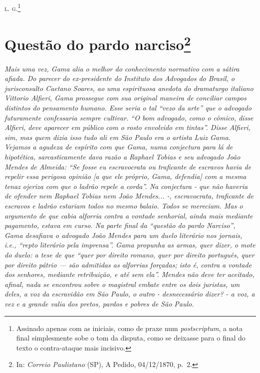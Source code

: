 {\textsc{l. g.}\footnote{ Assinado apenas com as iniciais, como de praxe num
  \emph{postscriptum}, a nota final simplesmente sobe o tom da disputa,
  como se deixasse para o final do texto o contra-ataque mais incisivo.}

\chapter{Questão do pardo narciso\footnote{ In: \emph{Correio Paulistano} (SP), A Pedido, 04/12/1870,
  p.~2.}} %

\begin{didascalia}
\emph{Mais uma vez, Gama alia o melhor do conhecimento normativo com a
sátira afiada. Do parecer do ex-presidente do Instituto dos Advogados do
Brasil, o jurisconsulto Caetano Soares, ao uma espirituosa anedota do
dramaturgo italiano Vittorio Alfieri, Gama prossegue com sua original
maneira de conciliar campos distintos do pensamento humano. Esse seria o
tal ``vezo da arte'' que o advogado futuramente confessaria sempre
cultivar. ``O bom advogado, como o cômico, disse Alfieri, deve aparecer
em público com o rosto envolvido em tintas''. Disse Alfieri, sim, mas
quem dizia isso tudo ali em São Paulo era o artista Luiz Gama. Vejamos a
agudeza de espírito com que Gama, numa conjectura para lá de hipotética,
sarcasticamente dava razão a Raphael Tobias e seu advogado João Mendes
de Almeida: ``Se fosse eu escravocrata ou traficante de escravos havia de
repelir essa perigosa opinião {[}a que ele próprio, Gama, defendia{]}
com a mesma tenaz ojeriza com que o ladrão repele a corda''. Na
conjectura - que não haveria de ofender nem Raphael Tobias nem João
Mendes... -, escravocrata, traficante de escravos e ladrão estariam
todos no mesmo balaio. Todos se mereciam. Mas o argumento de que cabia
alforria contra a vontade senhorial, ainda mais mediante pagamento,
estava em curso. Na parte final da ``questão do pardo Narciso'', Gama
desafiava o advogado João Mendes para um duelo literário nos jornais,
i.e., ``repto literário pela imprensa''. Gama propunha as armas, quer
dizer, o mote do duelo: a tese de que ``quer por direito romano, quer por
direito português, quer por direito pátrio --- são admitidas as
alforrias forçadas; isto é, contra a vontade dos senhores, mediante
retribuição, e até sem ela''. Mendes não deve ter aceitado, afinal, nada
se encontrou sobre o magistral embate entre os dois juristas, um deles,
a voz da escravidão em São Paulo, o outro - desnecessário dizer? - a
voz, a vez e a grande valia dos pretos, pardos e pobres de São Paulo.}
\end{didascalia}

}
